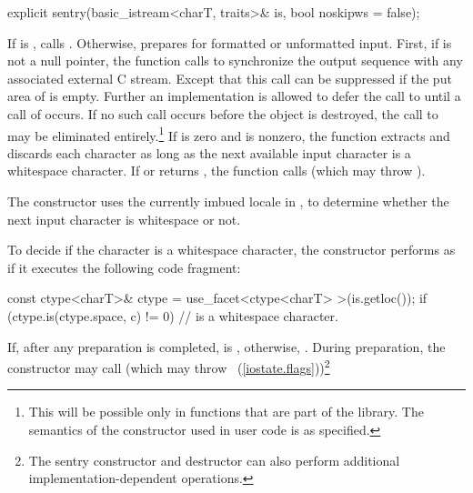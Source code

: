 %
%
\begin{itemdecl}
explicit sentry(basic_istream<charT, traits>& is, bool noskipws = false);
\end{itemdecl}

\begin{itemdescr}
\pnum
\effects
If
is
,
calls . Otherwise,
prepares for formatted or
unformatted input.
First, if
is not a null pointer, the
function calls
%
to synchronize the output sequence with any associated external
C stream.
Except that this call can be suppressed if the put area of
is empty.
Further an implementation is allowed to defer the call to
until a
call of
occurs.
If no such call occurs before the
object is destroyed, the call to
may be eliminated entirely.\footnote{This will be possible only in functions
that are part of the library.
The semantics of the constructor used in user code is as specified.}
If  is zero and
is nonzero, the function extracts and discards each character as long as
the next available input character  is a whitespace character.
If
or
returns
,
the function calls
(which may throw
).

\pnum
\remarks
The constructor
uses the currently imbued locale in ,
to determine whether the next input character is
whitespace or not.

\pnum
To decide if the character  is a whitespace character,
the constructor performs as if it executes the following code fragment:
\begin{codeblock}
const ctype<charT>& ctype = use_facet<ctype<charT> >(is.getloc());
if (ctype.is(ctype.space, c) != 0)
  //  is a whitespace character.
\end{codeblock}

\pnum
If, after any preparation is completed,
is
,
otherwise,
.
During preparation, the constructor may call
(which may throw
~(\ref{iostate.flags}))\footnote{The sentry
constructor and destructor
can also perform additional
%
implementation-dependent operations.}
\end{itemdescr}

